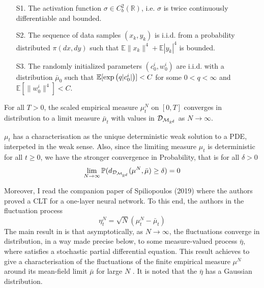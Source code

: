 \documentclass{article}
\begin{document}
\begin{itemize}\label{assumptions spiliopoulos}
	\item[{\sf S1.}] The activation function $\sigma\in C^{2}_{b}(\mathbb{R})$, i.e. $\sigma$ is twice continuously differentiable and bounded.
\item[{\sf S2.}] The sequence of data samples $(x_k, y_k)$ is i.i.d. from a probability distributed $\pi(dx,dy)$ such that $\mathbb{E}\parallel x_{k}\parallel^{4}+\mathbb{E}|y_{k}|^{4}$ is bounded.
\item[{\sf S3.}] The randomly initialized parameters $(c_0^i, w_0^i)$ are i.i.d. with a distribution $\bar \mu_0$ such that $\mathbb{E}[ \exp \big{(} q | c_0^i | \big{)} ] < C$ for some $0 < q < \infty$ and $\mathbb{E}[ \parallel w_0^i \parallel^4 ] < C$.

\end{itemize}

\begin{theorem}\label{thm: spilopoulos lln}
	For all $ T>0$, the scaled empirical measure $ \mu^{N}_{t}$ on $ [0,T]$ converges in distribution to a
 limit measure $ \bar{\mu}_{t}$ with values in $  \mathcal{D}_{\mathcal{M}_{\mathbb{R}^{d}}} $ as $ N\to \infty$.
\end{theorem}

\begin{remark}
    $ \mu_{t}$ has a characterisation as the unique deterministic weak solution to a PDE, interpeted in the weak sense. Also, since the limiting measure $ \mu_{t}$ is deterministic for all $ t\geq 0$, we have the stronger convergence in Probability, that is for all $ \delta >0$
    \[
    \displaystyle \lim_{N\to \infty}\mathbb{P}(d_{  \mathcal{D}_{\mathcal{M}_{\mathbb{R}^{d}}} }(\mu^{N}, \bar{\mu})\geq \delta) = 0 
    \]
    
\end{remark}


Moreover, I read the companion paper of Spiliopoulos (2019) \cite{sirignano2019meanfieldanalysisclt} where the authors proved a CLT for a one-layer neural network. To this end, the authors in \cite{sirignano2019meanfieldanalysisclt} the fluctuation process 
\begin{equation}
	\eta^{N}_t = \sqrt{N}(\mu^{N}_{t}-\bar{\mu}_{t})
\end{equation}
The main result in \cite{sirignano2019meanfieldanalysisclt} is that asymptotically, as $ N\to \infty$, the fluctuations converge in distribution, in a way made precise below, to some measure-valued process $ \bar{\eta}$, where satisfies a stochastic partial differential equation. This result achieves to give a characterisation of the fluctuations of the finite empirical measure $ \mu^{N}$ around its mean-field limit $ \bar{\mu}$ for large $ N$ . It is noted that the $ \bar{\eta}$
has a Gaussian distribution.
\end{document}
